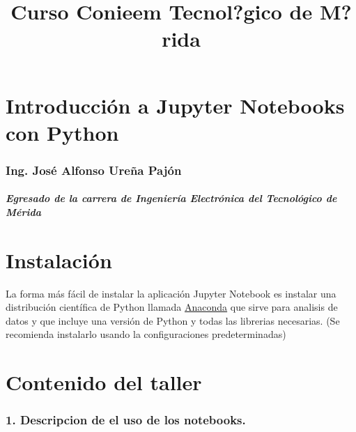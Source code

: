 \documentclass[11pt]{article}
\title{Curso Conieem Tecnol?gico de M?rida}
\begin{document}
    
    
    \maketitle
    
    

    
    \hypertarget{introducciuxf3n-a-jupyter-notebooks-con-python}{%
\section{Introducción a Jupyter Notebooks con
Python}\label{introducciuxf3n-a-jupyter-notebooks-con-python}}

\hypertarget{ing.-josuxe9-alfonso-ureuxf1a-pajuxf3n}{%
\subsubsection{Ing. José Alfonso Ureña
Pajón}\label{ing.-josuxe9-alfonso-ureuxf1a-pajuxf3n}}

\hypertarget{egresado-de-la-carrera-de-ingenieruxeda-electruxf3nica-del-tecnoluxf3gico-de-muxe9rida}{%
\subparagraph{Egresado de la carrera de Ingeniería Electrónica del
Tecnológico de
Mérida}\label{egresado-de-la-carrera-de-ingenieruxeda-electruxf3nica-del-tecnoluxf3gico-de-muxe9rida}}

    \hypertarget{instalaciuxf3n}{%
\section{Instalación}\label{instalaciuxf3n}}

La forma más fácil de instalar la aplicación Jupyter Notebook es
instalar una distribución científica de Python llamada
\href{https://www.anaconda.com/download/\#windows}{Anaconda} que sirve
para analisis de datos y que incluye una versión de Python y todas las
librerias necesarias. (Se recomienda instalarlo usando la
configuraciones predeterminadas)

    \hypertarget{contenido-del-taller}{%
\section{Contenido del taller}\label{contenido-del-taller}}

\hypertarget{descripcion-de-el-uso-de-los-notebooks.}{%
\subsubsection{1. Descripcion de el uso de los
notebooks.}\label{descripcion-de-el-uso-de-los-notebooks.}}
\end{document}
